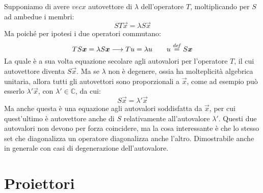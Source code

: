 Supponiamo di avere $vec{x}$ autovettore di $\lambda$ dell'operatore $T$, moltiplicando per $S$ ad ambedue i membri:
\begin{equation*}
    ST\vec{x} = \lambda S \vec{x}
\end{equation*}
Ma poiché per ipotesi i due operatori commutano:
\begin{equation*}
    TS\boldsymbol{x} = \lambda S \boldsymbol{x} \longrightarrow
    T u = \lambda u \qquad u\overset{\mathit{def}}{=} S\boldsymbol{x}
\end{equation*}
La quale è a sua volta equazione secolare agli autovalori per l'operatore $T$, il cui autovettore diventa $S\vec{x}$. Ma se $\lambda$ non è degenere, ossia ha molteplicità algebrica unitaria, allora tutti gli autovettori sono proporzionali a $\vec{x}$, come ad esempio può esserlo $\lambda'\vec{x}$, con $\lambda'\in\mathbb{C}$, da cui:
\begin{equation*}
    S\vec{x} = \lambda' \vec{x}
\end{equation*}
Ma anche questa è una equazione agli autovalori soddisfatta da $\vec{x}$, per cui quest'ultimo è autovettore anche di $S$ relativamente all'autovalore $\lambda'$. Questi due autovalori non devono per forza coincidere, ma la cosa interessante è che lo stesso set che diagonalizza un operatore diagonalizza anche l'altro. Dimostrabile anche in generale con casi di degenerazione dell'autovalore.


\section{Proiettori}

